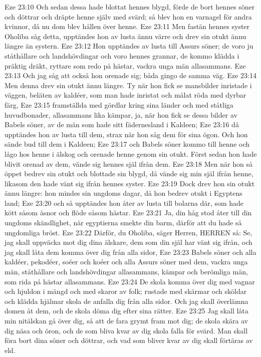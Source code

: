 Eze 23:10  Och sedan dessa hade blottat hennes blygd, förde de bort hennes söner och döttrar och dräpte henne själv med svärd; så blev hon en varnagel för andra kvinnor, då nu dom blev hållen över henne.
Eze 23:11  Men fastän hennes syster Oholiba såg detta, upptändes hon av lusta ännu värre och drev sin otukt ännu längre än systern.
Eze 23:12  Hon upptändes av lusta till Assurs söner; de voro ju ståthållare och landshövdingar och voro hennes grannar, de kommo klädda i präktig dräkt, ryttare som redo på hästar, vackra unga män allasammans.
Eze 23:13  Och jag såg att också hon orenade sig; båda gingo de samma väg.
Eze 23:14  Men denna drev sin otukt ännu längre. Ty när hon fick se mansbilder inristade i väggen, beläten av kaldéer, som man hade inristat och målat röda med dyrbar färg,
Eze 23:15  framställda med gördlar kring sina länder och med ståtliga huvudbonader, allasammans lika kämpar, ja, när hon fick se dessa bilder av Babels söner, av de män som hade sitt fädernesland i Kaldeen;
Eze 23:16  då upptändes hon av lusta till dem, strax när hon såg dem för sina ögon. Och hon sände bud till dem i Kaldeen;
Eze 23:17  och Babels söner kommo till henne och lågo hos henne i älskog och orenade henne genom sin otukt. Först sedan hon hade blivit orenad av dem, vände sig hennes själ ifrån dem.
Eze 23:18  Men när hon så öppet bedrev sin otukt och blottade sin blygd, då vände sig min själ ifrån henne, likasom den hade vänt sig ifrån hennes syster.
Eze 23:19  Dock drev hon sin otukt ännu längre: hon mindes sin ungdoms dagar, då hon bedrev otukt i Egyptens land;
Eze 23:20  och så upptändes hon åter av lusta till bolarna där, som hade kött såsom åsnor och flöde såsom hästar.
Eze 23:21  Ja, din håg stod åter till din ungdoms skändlighet, när egyptierna smekte din barm, därför att du hade så ungdomliga bröst.
Eze 23:22  Därför, du Oholiba, säger Herren, HERREN så: Se, jag skall uppväcka mot dig dina älskare, dem som din själ har vänt sig ifrån, och jag skall låta dem komma över dig från alla sidor,
Eze 23:23  Babels söner och alla kaldéer, pekodéer, soéer och koéer och alla Assurs söner med dem, vackra unga män, ståthållare och landshövdingar allasammans, kämpar och berömliga män, som rida på hästar allasammans.
Eze 23:24  De skola komma över dig med vagnar och hjuldon i mängd och med skaror av folk; rustade med skärmar och sköldar och klädda hjälmar skola de anfalla dig från alla sidor. Och jag skall överlämna domen åt dem, och de skola döma dig efter sina rätter.
Eze 23:25  Jag skall låta min nitälskan gå över dig, så att de fara grymt fram mot dig; de skola skära av dig näsa och öron, och de som bliva kvar av dig skola falla för svärd. Man skall föra bort dina söner och döttrar, och vad som bliver kvar av dig skall förtäras av eld.
